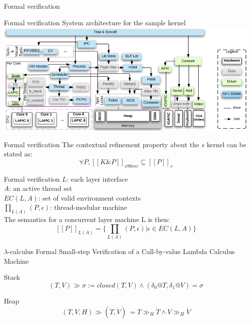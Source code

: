 \documentclass{beamer}
\begin{document}
\begin{CJK*}{UTF8}{bsmi}
\begin{frame}{{Formal verification}}
    \end{frame}

    \begin{frame}{Formal verification}
        System architecture for the sample kernel \cite{10.5555/3026877.3026928}
        \includegraphics[width=\textwidth]{Screenshot_2021-05-13_15-48-01.png}
    \end{frame}

    \begin{frame}{Formal verification}
        The contextual refinement property about the $s$ kernel can be stated as:
        $$\forall P, [[K \& P]]_{x86mc} \subseteq [[P]]_{s}$$

    \end{frame}

    \begin{frame}{Formal verification}
        $L$: each layer interface \\
        $A$: an active thread set \\
        $EC(L,A)$: set of valid environment contexts\\
        $\prod_{L(A)}(P,\epsilon)$: thread-modular machine\\
        The semantics for a concurrent layer machine L is then:
        $$[[P]]_{L(A)} = \{\prod_{L(A)}(P,\epsilon) \vert \epsilon \in  EC(L,A)\}$$
    \end{frame}

    \begin{frame}{$\lambda$-calculus}
        Formal Small-step Verification of a Call-by-value Lambda Calculus Machine \cite{Kunze_2018}
        \begin{beamerboxesrounded}[shadow=true,width=\textwidth]{Stack}
            $$(T, V ) \gg \sigma := closed(T, V) \wedge (\delta_0@T, \delta_1@V ) = \sigma$$
        \end{beamerboxesrounded}

        \begin{beamerboxesrounded}[shadow=true,width=\textwidth]{Heap}
            $$(T, V, H) \gg (\dot{T}, \dot{V}) \:= T \gg_H \dot{T} \wedge V \gg_H \dot{V}$$


\end{beamerboxesrounded}
\end{frame}
\end{CJK*}
\end{document}
